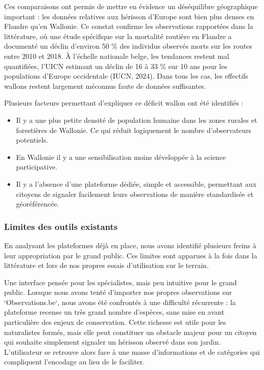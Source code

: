 \documentclass[a4paper,11pt]{article}
\begin{document}
Ces comparaisons ont permis de mettre en évidence un déséquilibre géographique important : les données relatives aux hérisson d’Europe sont bien plus denses en Flandre qu'en Wallonie. Ce constat confirme les observations rapportées dans la littérature, où une étude spécifique sur la mortalité routière en Flandre a documenté un déclin d'environ 50 \% des individus observés morts sur les routes entre 2010 et 2018. À l'échelle nationale belge, les tendances restent mal quantifiées, l'UICN estimant un déclin de 16 à 33 \% sur 10 ans pour les populations d'Europe occidentale (IUCN, 2024). Dans tous les cas, les effectifs wallons restent largement méconnus faute de données suffisantes.

Plusieurs facteurs permettant d’expliquer ce déficit wallon ont été identifiés :
\begin{itemize}
    \item Il y a une plus petite densité de population humaine dans les zones rurales et forestières de Wallonie. Ce qui réduit logiquement le nombre d'observateurs potentiels.
    \item En Wallonie il y a une sensibilisation moins développée à la science participative.
    \item Il y a l'absence d'une plateforme dédiée, simple et accessible, permettant aux citoyens de signaler facilement leurs observations de manière standardisée et géoréférencée.
\end{itemize}

\subsubsection{Limites des outils existants}

En analysant les plateformes déjà en place, nous avons identifié plusieurs freins à leur appropriation par le grand public. Ces limites sont apparues à la fois dans la littérature et lors de nos propres essais d’utilisation sur le terrain.

Une interface pensée pour les spécialistes, mais peu intuitive pour le grand public. Lorsque nous avons tenté d'importer nos propres observations sur `Observations.be`, nous avons été confrontés à une difficulté récurrente : la plateforme recense un très grand nombre d’espèces, sans mise en avant particulière des enjeux de conservation. Cette richesse est utile pour les naturalistes formés, mais elle peut constituer un obstacle majeur pour un citoyen qui souhaite simplement signaler un hérisson observé dans son jardin. L’utilisateur se retrouve alors face à une masse d’informations et de catégories qui compliquent l’encodage au lieu de le faciliter.
\end{document}
